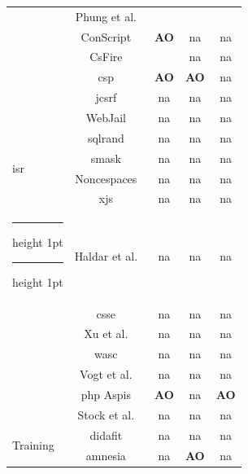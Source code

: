 \documentclass[conference]{IEEEtran}
\makeatletter
\newcommand{\tick}{\ding{52}}
\newcommand{\thickhline}{%
    \noalign {\ifnum 0=`}\fi \hrule height 1pt
    \futurelet \reserved@a \@xhline
}
\makeatother
\begin{document}
\begin{table}
\begin{threeparttable}
\begin{small}
{\begin{tabular}{l|c|ccc}
  &   Phung et al.~\cite{PSC09} & \tick & \tick & \tick \\
  &   ConScript~\cite{ML10} & {\bf AO} & {\sc na} & {\sc na} \\
  &   CsFire~\cite{DDHPJ10} & \tick & {\sc na} & {\sc na} \\
  &   {\sc csp}~\cite{SSM10} & {\bf AO} & {\bf AO} & {\sc na} \\
  &   j{\sc csrf}~\cite{PS11} & {\sc na} & {\sc na} & {\sc na} \\
  &   WebJail~\cite{VDDPJ11} & {\sc na} & {\sc na} & {\sc na} \\
  \hline
  \multirow{4}{*}{{\sc isr}}
  &   {\sc sql}rand~\cite{BK04} & {\sc na} & {\sc na} & {\sc na} \\
  &   {\sc sm}ask~\cite{JB07} & {\sc na} & {\sc na} & {\sc na} \\
  &   Noncespaces~\cite{GC09} & {\sc na} & {\sc na} & {\sc na} \\
  &   x{\sc js}~\cite{APKLM10} & {\sc na} & {\sc na} & {\sc na} \\
  \thickhline
  \thickhline
  \multirow{7}{*}{Taint Tracking}
  &   Haldar et al.~\cite{HCF05}  & {\sc na} & {\sc na} & {\sc na} \\
  &   {\sc csse}~\cite{PB05} & {\sc na} & {\sc na} & {\sc na} \\
  &   Xu et al.~\cite{XBS06}  & {\sc na} & {\sc na} & {\sc na} \\
  &   {\sc wasc}~\cite{NLC07} & {\sc na} & {\sc na} & {\sc na} \\
  &   Vogt et al.~\cite{VFJKKV07}  & {\sc na} & {\sc na} & {\sc na} \\
  &   {\sc php} Aspis~\cite{PMP11} & {\bf AO} & {\sc na} & {\bf AO} \\
  &   Stock et al.~\cite{SLMS14} & {\sc na} & {\sc na} & {\sc na} \\
  \hline
  \multirow{6}{*}{Training}
  &   {\sc didafit}~\cite{LLW02} & {\sc na} & {\sc na} & {\sc na} \\
  &   {\sc amnesia}~\cite{HO05,HO06,HO05b} & {\sc na} & {\bf AO} & {\sc na} \\

\end{tabular}}
\end{small}
\end{threeparttable}
\end{table}
\end{document}
